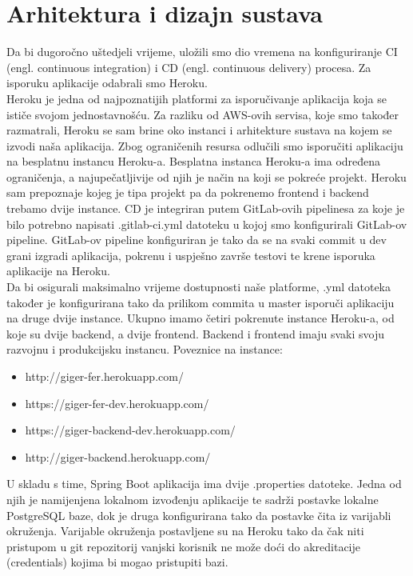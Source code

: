 \chapter{Arhitektura i dizajn sustava}
		
	Da bi dugoročno uštedjeli vrijeme, uložili smo dio vremena na konfiguriranje CI (engl. continuous integration) i CD (engl. continuous delivery) procesa. Za isporuku aplikacije odabrali smo Heroku.\\
	Heroku je jedna od najpoznatijih platformi za isporučivanje aplikacija koja se ističe svojom jednostavnošću.
	Za razliku od AWS-ovih servisa, koje smo također razmatrali, Heroku se sam brine oko instanci i arhitekture sustava na kojem se izvodi naša aplikacija. Zbog ograničenih resursa odlučili smo isporučiti aplikaciju na besplatnu instancu Heroku-a.
	Besplatna instanca Heroku-a ima određena ograničenja, a najupečatljivije od njih je način na koji se pokreće projekt.
	Heroku sam prepoznaje kojeg je tipa projekt pa da pokrenemo frontend i backend trebamo dvije instance.
	CD je integriran putem GitLab-ovih pipelinesa za koje je bilo potrebno napisati .gitlab-ci.yml datoteku u kojoj smo konfigurirali GitLab-ov pipeline. GitLab-ov pipeline konfiguriran je tako da se na svaki commit u dev grani izgradi aplikacija, pokrenu i uspješno završe testovi te krene isporuka aplikacije na Heroku.\\
	Da bi osigurali maksimalno vrijeme dostupnosti naše platforme, .yml datoteka također je konfigurirana tako da prilikom commita u master isporuči aplikaciju na druge dvije instance.
	Ukupno imamo četiri pokrenute instance Heroku-a, od koje su dvije backend, a dvije frontend. Backend i frontend imaju svaki svoju razvojnu i produkcijsku instancu. Poveznice na instance:
	\begin{itemize}
		\item http://giger-fer.herokuapp.com/
		\item https://giger-fer-dev.herokuapp.com/
		\item https://giger-backend-dev.herokuapp.com/
		\item http://giger-backend.herokuapp.com/
	\end{itemize}
	
	
	U skladu s time, Spring Boot aplikacija ima dvije .properties datoteke. Jedna od njih je namijenjena lokalnom izvođenju aplikacije te sadrži postavke lokalne PostgreSQL baze, dok je druga konfigurirana tako da postavke čita iz varijabli okruženja. Varijable okruženja postavljene su na Heroku tako da čak niti pristupom u git repozitorij vanjski korisnik ne može doći do akreditacije (credentials) kojima bi mogao pristupiti bazi.
	
